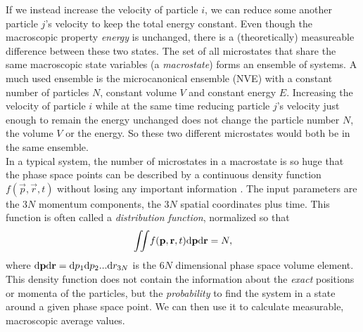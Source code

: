 If we instead increase the velocity of particle $i$, we can reduce some another particle $j$'s velocity to keep the total energy constant. Even though the macroscopic property \textit{energy} is unchanged, there is a (theoretically) measureable difference between these two states. The set of all microstates that share the same macroscopic state variables (a \textit{macrostate}) forms an ensemble of systems. A much used ensemble is the microcanonical ensemble (NVE) with a constant number of particles $N$, constant volume $V$ and constant energy $E$. Increasing the velocity of particle $i$ while at the same time reducing particle $j$'s velocity just enough to remain the energy unchanged does not change the particle number $N$, the volume $V$ or the energy. So these two different microstates would both be in the same ensemble.\\

In a typical system, the number of microstates in a macrostate is so huge that the phase space points can be described by a continuous density function $f(\vec p, \vec r, t)$ without losing any important information \cite{mcquarrie1973statistical}. The input parameters are the $3N$ momentum components, the $3N$ spatial coordinates plus time. This function is often called a \textit{distribution function}, normalized so that
\begin{align}
	\iint\! f(\mathbf p, \mathbf r, t) \mathrm{d}\mathbf p\mathrm{d}\mathbf r = N,
\end{align}
where $\mathrm{d}\mathbf p\mathrm{d}\mathbf r=\mathrm{d}p_1\mathrm{d}p_2...\mathrm{d}r_{3N}$ is the $6N$ dimensional phase space volume element. This density function does not contain the information about the \textit{exact} positions or momenta of the particles, but the \textit{probability} to find the system in a state around a given phase space point. We can then use it to calculate measurable, macroscopic average values. 

